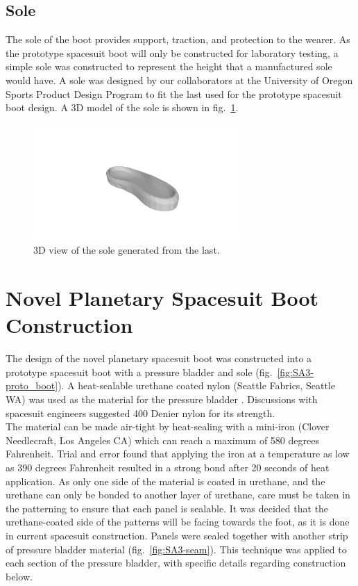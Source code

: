 \documentclass[defaultstyle,11pt]{comps}
\begin{document}
\hypertarget{sole-1}{%
\subsection{Sole}\label{sole-1}}

The sole of the boot provides support, traction, and protection to the wearer.
As the prototype spacesuit boot will only be constructed for laboratory testing, a simple sole was constructed to represent the height that a manufactured sole would have.
A sole was designed by our collaborators at the University of Oregon Sports Product Design Program to fit the last used for the prototype spacesuit boot design.
A 3D model of the sole is shown in fig.~\ref{fig:SA3-solemold}.

\begin{figure}
\hypertarget{fig:SA3-solemold}{%
\centering
\includegraphics[width=0.7\textwidth,height=\textheight]{../fig/SA3/sole_3d.png}
\caption{3D view of the sole generated from the last.}\label{fig:SA3-solemold}
}
\end{figure}

\hypertarget{novel-planetary-spacesuit-boot-construction}{%
\section{Novel Planetary Spacesuit Boot Construction}\label{novel-planetary-spacesuit-boot-construction}}

The design of the novel planetary spacesuit boot was constructed into a prototype spacesuit boot with a pressure bladder and sole (fig.~\ref{fig:SA3-proto_boot}).
A heat-sealable urethane coated nylon (Seattle Fabrics, Seattle WA) was used as the material for the pressure bladder \citep{Harris2001}.
Discussions with spacesuit engineers suggested 400 Denier nylon for its strength.\\
The material can be made air-tight by heat-sealing with a mini-iron (Clover Needlecraft, Los Angeles CA) which can reach a maximum of 580 degrees Fahrenheit.
Trial and error found that applying the iron at a temperature as low as 390 degrees Fahrenheit resulted in a strong bond after 20 seconds of heat application.
As only one side of the material is coated in urethane, and the urethane can only be bonded to another layer of urethane, care must be taken in the patterning to ensure that each panel is sealable.
It was decided that the urethane-coated side of the patterns will be facing towards the foot, as it is done in current spacesuit construction.
Panels were sealed together with another strip of pressure bladder material (fig.~\ref{fig:SA3-seam}).
This technique was applied to each section of the pressure bladder, with specific details regarding construction below.
\end{document}
